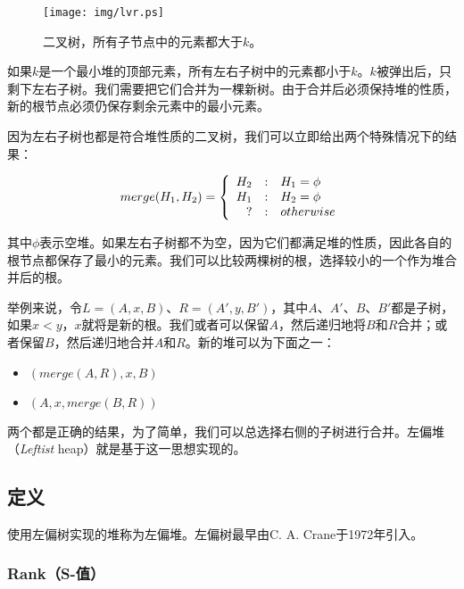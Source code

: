 \documentclass[UTF8]{article}
\begin{document}
\begin{figure}[htbp]
    \centering
    \texttt{[image: img/lvr.ps]}
    \caption{二叉树，所有子节点中的元素都大于$k$。} \label{fig:lvr}
\end{figure}

如果$k$是一个最小堆的顶部元素，所有左右子树中的元素都小于$k$。$k$被弹出后，只剩下左右子树。我们需要把它们合并为一棵新树。由于合并后必须保持堆的性质，新的根节点必须仍保存剩余元素中的最小元素。

因为左右子树也都是符合堆性质的二叉树，我们可以立即给出两个特殊情况下的结果：

\[
merge(H_1, H_2) = \left \{
  \begin{array}
  {r@{\quad:\quad}l}
  H_2 & H_1 = \phi \\
  H_1 & H_2 = \phi \\
  ? & otherwise
  \end{array}
\right.
\]

其中$\phi$表示空堆。如果左右子树都不为空，因为它们都满足堆的性质，因此各自的根节点都保存了最小的元素。我们可以比较两棵树的根，选择较小的一个作为堆合并后的根。

举例来说，令$L = (A, x, B)$、$R = (A', y, B')$，其中$A$、$A'$、$B$、$B'$都是子树，如果$x < y$，$x$就将是新的根。我们或者可以保留$A$，然后递归地将$B$和$R$合并；或者保留$B$，然后递归地合并$A$和$R$。新的堆可以为下面之一：

\begin{itemize}
\item $(merge(A, R), x, B)$
\item $(A, x, merge(B, R))$
\end{itemize}

两个都是正确的结果，为了简单，我们可以总选择右侧的子树进行合并。左偏堆（{\em Leftist} heap）就是基于这一思想实现的。

\subsection{定义}

使用左偏树实现的堆称为左偏堆。左偏树最早由C. A. Crane于1972年引入\cite{wiki-leftist-tree}。

\subsubsection{Rank（S-值）}
\end{document}

